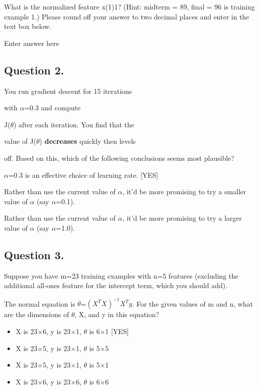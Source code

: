 \documentclass[11pt]{article} %
\begin{document}
	What is the normalized feature x(1)1? (Hint: midterm = 89, final = 96 is training example 1.) Please round off your answer to two decimal places and enter in the text box below.
	
	Enter answer here
	
	\subsection{Question 2.} 
	You run gradient descent for 15 iterations
	
	with $\alpha$=0.3 and compute
	
	J($\theta$) after each iteration. You find that the
	
	value of J($\theta$) \textbf{decreases} quickly then levels
	
	off. Based on this, which of the following conclusions seems most plausible?
	
	
	
	$\alpha$=0.3 is an effective choice of learning rate.  [YES]
	
	Rather than use the current value of $\alpha$, it'd be more promising to try a smaller value of $\alpha$ (say $\alpha$=0.1).
	
	Rather than use the current value of $\alpha$, it'd be more promising to try a larger value of $\alpha$ (say $\alpha$=1.0).
	
	\subsection{Question 3.} 
	
	Suppose you have m=23 training examples 
	with n=5 features (excluding the 
	additional all-ones feature for the intercept term, which you should add).
	
	The normal equation is $\theta$=$(X^TX)^{-1}X^{T}y$. For the given values of m and n, 
	what are the dimensions of $\theta$, X, and y in this equation?
	
	\begin{itemize}
		\item X is 23$\times$6, y is 23$\times$1, $\theta$ is 6$\times$1 [YES]
		
		\item X is 23$\times$5, y is 23$\times$1, $\theta$ is 5$\times$5
		
		\item X is 23$\times$5, y is 23$\times$1, $\theta$ is 5$\times$1
		
		\item X is 23$\times$6, y is 23$\times$6, $\theta$ is 6$\times$6
	\end{itemize}
\end{document}
